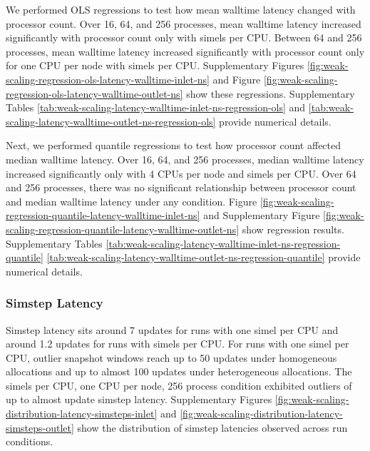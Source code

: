 We performed OLS regressions to test how mean walltime latency changed with processor count.
Over 16, 64, and 256 processes, mean walltime latency increased significantly with processor count only with  simels per CPU.
Between 64 and 256 processes, mean walltime latency increased significantly with processor count only for one CPU per node with  simels per CPU.
Supplementary Figures \ref{fig:weak-scaling-regression-ols-latency-walltime-inlet-ns} and Figure \ref{fig:weak-scaling-regression-ols-latency-walltime-outlet-ns} show these regressions.
Supplementary Tables \ref{tab:weak-scaling-latency-walltime-inlet-ns-regression-ols} and \ref{tab:weak-scaling-latency-walltime-outlet-ns-regression-ols} provide numerical details.



Next, we performed quantile regressions to test how processor count affected median walltime latency.
Over 16, 64, and 256 processes, median walltime latency increased significantly only with 4 CPUs per node and  simels per CPU.
Over 64 and 256 processes, there was no significant relationship between processor count and median walltime latency under any condition.
Figure \ref{fig:weak-scaling-regression-quantile-latency-walltime-inlet-ns} and Supplementary Figure \ref{fig:weak-scaling-regression-quantile-latency-walltime-outlet-ns} show regression results.
Supplementary Tables \ref{tab:weak-scaling-latency-walltime-inlet-ns-regression-quantile} \ref{tab:weak-scaling-latency-walltime-outlet-ns-regression-quantile} provide numerical details.

\subsubsection{Simstep Latency}

Simstep latency sits around 7 updates for runs with one simel per CPU and around 1.2 updates for runs with  simels per CPU.
For runs with one simel per CPU, outlier snapshot windows reach up to 50 updates under homogeneous allocations and up to almost 100 updates under heterogeneous allocations.
The  simels per CPU, one CPU per node, 256 process condition exhibited outliers of up to almost  update simstep latency.
Supplementary Figures \ref{fig:weak-scaling-distribution-latency-simsteps-inlet} and \ref{fig:weak-scaling-distribution-latency-simsteps-outlet}  show the distribution of simstep latencies observed across run conditions.

